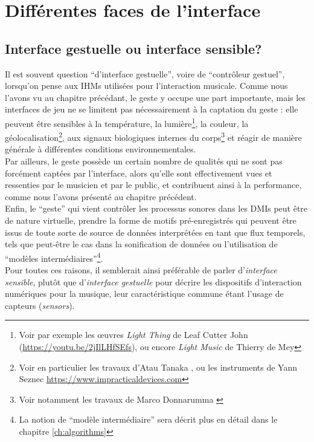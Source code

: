 \section{Différentes faces de l'interface}

\subsection{Interface gestuelle ou interface sensible?}


\noindent Il est souvent question ``d'interface gestuelle'', voire de ``contrôleur gestuel'', lorsqu'on pense aux \glspl{IHM} utilisées pour l'interaction musicale. Comme nous l'avons vu au chapitre précédant, le geste y occupe une part importante, mais les interfaces de jeu ne se limitent pas nécessairement à la captation du geste : elle peuvent être sensibles à la température, la lumière\footnote{Voir par exemple les œuvres \textit{Light Thing} de Leaf Cutter John (\url{https://youtu.be/2jIlLHfSEfs}), ou encore \textit{Light Music} de Thierry de Mey}, la couleur, la géolocalisation\footnote{Voir en particulier les travaux d'Atau Tanaka \cite{tanaka_mobile_2004}, ou les instruments de Yann Seznec \url{https://www.impracticaldevices.com}}, aux signaux biologiques internes du corps\footnote{Voir notamment les travaux de Marco Donnarumma \cite{donnarumma_biophysical_2017}} et réagir de manière générale à différentes conditions environnementales.\\
\indent Par ailleurs, le geste possède un certain nombre de qualités qui ne sont pas forcément captées par l'interface, alors qu'elle sont effectivement vues et ressenties par le musicien et par le public, et contribuent ainsi à la performance, comme nous l'avons présenté au chapitre précédent.\\
\indent Enfin, le ``geste'' qui vient contrôler les processus sonores dans les \glspl{DMI} peut être de nature virtuelle, prendre la forme de motifs pré-enregistrés qui peuvent être issus de toute sorte de source de données interprétées en tant que flux temporels, tels que peut-être le cas dans la sonification de données ou l'utilisation de ``modèles intermédiaires''\footnote{La notion de ``modèle intermédiaire'' sera décrit plus en détail dans le chapitre \ref{ch:algorithms}}.\\
\indent Pour toutes ces raisons, il semblerait ainsi préférable de parler d'\textit{interface sensible}, plutôt que d'\textit{interface gestuelle} pour décrire les dispositifs d'interaction numériques pour la musique, leur caractéristique commune étant l'usage de capteurs (\textit{sensors}).
